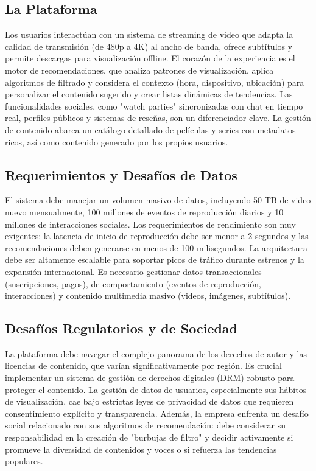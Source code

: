 \documentclass[12pt]{article}
\begin{document}
\subsection{La Plataforma}
Los usuarios interactúan con un sistema de streaming de video que adapta la calidad de transmisión (de 480p a 4K) al ancho de banda, ofrece subtítulos y permite descargas para visualización offline. El corazón de la experiencia es el motor de recomendaciones, que analiza patrones de visualización, aplica algoritmos de filtrado y considera el contexto (hora, dispositivo, ubicación) para personalizar el contenido sugerido y crear listas dinámicas de tendencias. Las funcionalidades sociales, como "watch parties" sincronizadas con chat en tiempo real, perfiles públicos y sistemas de reseñas, son un diferenciador clave. La gestión de contenido abarca un catálogo detallado de películas y series con metadatos ricos, así como contenido generado por los propios usuarios.

\subsection{Requerimientos y Desafíos de Datos}
El sistema debe manejar un volumen masivo de datos, incluyendo 50 TB de video nuevo mensualmente, 100 millones de eventos de reproducción diarios y 10 millones de interacciones sociales. Los requerimientos de rendimiento son muy exigentes: la latencia de inicio de reproducción debe ser menor a 2 segundos y las recomendaciones deben generarse en menos de 100 milisegundos. La arquitectura debe ser altamente escalable para soportar picos de tráfico durante estrenos y la expansión internacional. Es necesario gestionar datos transaccionales (suscripciones, pagos), de comportamiento (eventos de reproducción, interacciones) y contenido multimedia masivo (videos, imágenes, subtítulos).

\subsection{Desafíos Regulatorios y de Sociedad}
La plataforma debe navegar el complejo panorama de los derechos de autor y las licencias de contenido, que varían significativamente por región. Es crucial implementar un sistema de gestión de derechos digitales (DRM) robusto para proteger el contenido. La gestión de datos de usuarios, especialmente sus hábitos de visualización, cae bajo estrictas leyes de privacidad de datos que requieren consentimiento explícito y transparencia. Además, la empresa enfrenta un desafío social relacionado con sus algoritmos de recomendación: debe considerar su responsabilidad en la creación de "burbujas de filtro" y decidir activamente si promueve la diversidad de contenidos y voces o si refuerza las tendencias populares.
\end{document}
